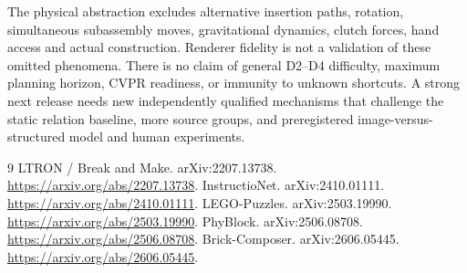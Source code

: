 \documentclass[10pt,twocolumn]{article}
\begin{document}
The physical abstraction excludes alternative insertion paths, rotation,
simultaneous subassembly moves, gravitational dynamics, clutch forces,
hand access and actual construction. Renderer fidelity is not a validation
of these omitted phenomena. There is no claim of general D2--D4 difficulty,
maximum planning horizon, CVPR readiness, or immunity to unknown shortcuts.
A strong next release needs new independently qualified mechanisms that
challenge the static relation baseline, more source groups, and preregistered
image-versus-structured model and human experiments.

\begin{thebibliography}{9}\small
{} LTRON / Break and Make. arXiv:2207.13738.
\url{https://arxiv.org/abs/2207.13738}.
 InstructioNet. arXiv:2410.01111.
\url{https://arxiv.org/abs/2410.01111}.
 LEGO-Puzzles. arXiv:2503.19990.
\url{https://arxiv.org/abs/2503.19990}.
 PhyBlock. arXiv:2506.08708.
\url{https://arxiv.org/abs/2506.08708}.
 Brick-Composer. arXiv:2606.05445.
\url{https://arxiv.org/abs/2606.05445}.
\end{thebibliography}
\end{document}
